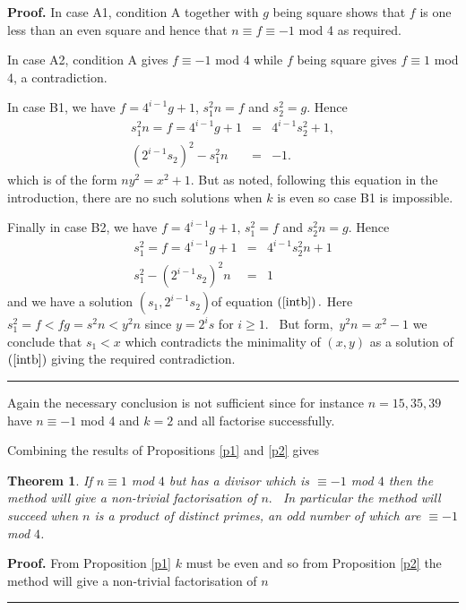 \documentclass[12pt]{article}
\newtheorem{theorem}{Theorem}
\newenvironment{proof}[1][Proof]{\textbf{#1.} }{\ \rule{0.5em}{0.5em}}
\begin{document}
\begin{proof}
In case A1, condition A together with $g$ being square shows that $f$ is one
less than an even square and hence that $n\equiv f\equiv -1$ mod 4 as
required.

In case A2, condition A gives $f\equiv -1$ mod 4 while $f$ being square
gives $f\equiv 1$ mod 4, a contradiction.

In case B1, we have $f=4^{i-1}g+1$, $s_{1}^{2}n=f$ and $s_{2}^{2}=g.$ Hence%
\begin{eqnarray*}
s_{1}^{2}n=f=4^{i-1}g+1 &=&4^{i-1}s_{2}^{2}+1, \\
\left( 2^{i-1}s_{2}\right) ^{2}-s_{1}^{2}n &=&-1.
\end{eqnarray*}%
which is of the form $ny^{2}=x^{2}+1$. But as noted, following this equation
in the introduction, there are no such solutions when $k$ is even so case B1
is impossible.

Finally in case B2, we have $f=4^{i-1}g+1,\,s_{1}^{2}=f$ and $s_{2}^{2}n=g.$
Hence 
\begin{eqnarray*}
s_{1}^{2}=f=4^{i-1}g+1 &=&4^{i-1}s_{2}^{2}n+1 \\
s_{1}^{2}-\left( 2^{i-1}s_{2}\right) ^{2}n &=&1
\end{eqnarray*}%
and we have a solution $\left( s_{1},2^{i-1}s_{2}\right) $of equation $%
\left( \ref{intb}\right) .$ Here $s_{1}^{2}=f<fg=s^{2}n<y^{2}n$ since $%
y=2^{i}s$ for $i\geq 1.$ \ But form$,$ $y^{2}n=x^{2}-1$ we conclude that $%
s_{1}<x$ which contradicts the minimality of $\left( x,y\right) $ as a
solution of $\left( \ref{intb}\right) $ giving the required contradiction.
\end{proof}

Again the necessary conclusion is not sufficient since for instance $%
n=15,35,39$ have $n\equiv -1$ mod 4 and $k=2$ and all factorise successfully.

Combining the results of Propositions \ref{p1} and \ref{p2} gives

\begin{theorem}
\label{t3}If $n\equiv 1$ mod $4$ but has a divisor which is $\equiv -1$ mod $%
4$ then the method will give a non-trivial factorisation of $n.$ \ In
particular the method will succeed when $n$ is a product of distinct primes,
an odd number of which are $\equiv -1$ mod $4$.
\end{theorem}

\begin{proof}
From Proposition \ref{p1} $k$ must be even and so from Proposition \ref{p2}
the method will give a non-trivial factorisation of $n$
\end{proof}
\end{document}
